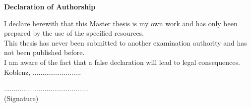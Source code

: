 \begin{center}
\vspace{2cm}    

\Large{\textbf{Declaration of Authorship}}
\vspace{2cm}
\end{center}

\begin{flushleft}
I declare herewith that this Master thesis is my own work and has only been prepared by the use of the specified resources.
\vspace{1cm} \\

This thesis has never been submitted to another examination authority and has not been published before.
\vspace{1cm} \\
I am aware of the fact that a false declaration will lead to legal consequences.
\vspace{1cm}
\\
Koblenz, .........................
\vspace{4cm}
\end{flushleft}

\begin{center}
    ............................................ \\
    
    (Signature)

\end{center}